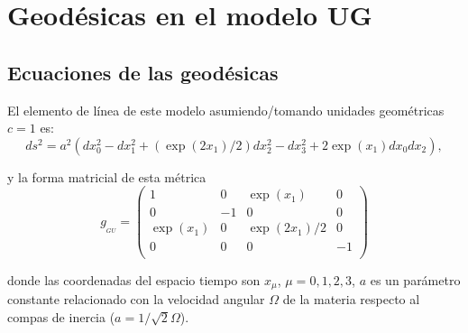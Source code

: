 \documentclass[11pt]{book}
\begin{document}
\chapter{Geodésicas en el modelo UG}




\section{Ecuaciones de las geodésicas}


El elemento de línea de este modelo asumiendo/tomando unidades geométricas $c=1$ es:
\begin{equation}
ds^2=a^2(dx_0^2-dx_1^2+(\exp(2x_1)/2)dx_2^2-dx_3^2+2\exp(x_1)dx_0dx_2),
\label{elinea}
\end{equation}

y la forma matricial de esta métrica
\begin{equation}
g_{_{GU}}=\left(
\begin{array}{cccc}
1 & 0 & \exp(x_1) & 0 \\
0 & -1 & 0 & 0 \\
\exp(x_1) & 0 & \exp(2x_1)/2& 0\\
0 & 0 & 0 & -1\\
\end{array} \right)
\label{gmatriz}
\end{equation}

donde las coordenadas del espacio tiempo son $x_\mu$, $\mu=
0,1,2,3$, $a$ es un parámetro constante relacionado con la velocidad angular $\Omega$ de la materia respecto al compas de inercia ($a=1/\sqrt{2}\Omega$).
\end{document}
